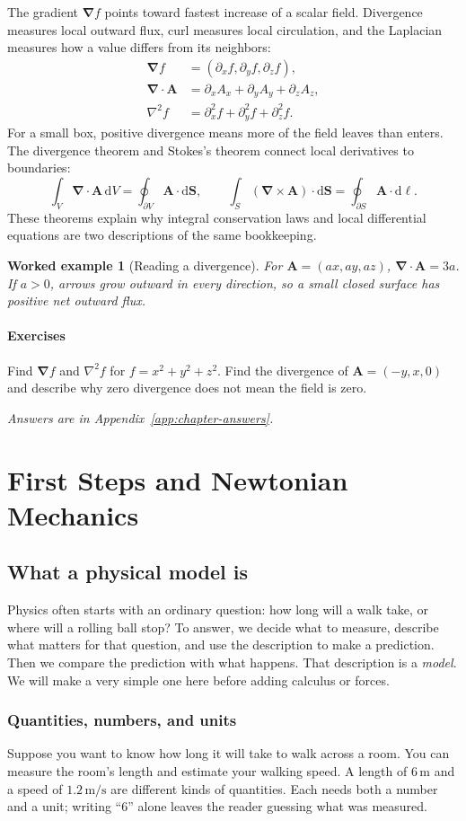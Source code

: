 \documentclass[11pt,oneside]{book}
\newcommand{\dd}{\mathrm{d}}
\newcommand{\vect}[1]{\boldsymbol{#1}}
\newcommand{\grad}{\boldsymbol{\nabla}}
\newcommand{\lap}{\nabla^2}
\theoremstyle{reviewstyle}
\newtheorem{example}{Worked example}[chapter]
\newcommand{\learningcheck}[1]{\subsection*{Exercises}\noindent #1\par\smallskip\noindent\emph{Answers are in Appendix~\ref{app:chapter-answers}.}}
\begin{document}
The gradient $\grad f$ points toward fastest increase of a scalar field. Divergence measures local outward flux, curl measures local circulation, and the Laplacian measures how a value differs from its neighbors:
\begin{align}
\grad f&=(\partial_xf,\partial_yf,\partial_zf),\\
\grad\cdot\vect A&=\partial_xA_x+\partial_yA_y+\partial_zA_z,\\
\lap f&=\partial_x^2f+\partial_y^2f+\partial_z^2f.
\end{align}
For a small box, positive divergence means more of the field leaves than enters. The divergence theorem and Stokes's theorem connect local derivatives to boundaries:
\begin{equation}
\int_V\grad\cdot\vect A\,\dd V=\oint_{\partial V}\vect A\cdot\dd\vect S,
\qquad
\int_S(\grad\times\vect A)\cdot\dd\vect S=\oint_{\partial S}\vect A\cdot\dd\vect\ell.
\end{equation}
These theorems explain why integral conservation laws and local differential equations are two descriptions of the same bookkeeping.

\begin{example}[Reading a divergence]
For $\vect A=(ax,ay,az)$, $\grad\cdot\vect A=3a$. If $a>0$, arrows grow outward in every direction, so a small closed surface has positive net outward flux.
\end{example}

\learningcheck{Find $\grad f$ and $\lap f$ for $f=x^2+y^2+z^2$. Find the divergence of $\vect A=(-y,x,0)$ and describe why zero divergence does not mean the field is zero.}

\part{First Steps and Newtonian Mechanics}
\chapter{What a physical model is}
Physics often starts with an ordinary question: how long will a walk take, or where will a rolling ball stop? To answer, we decide what to measure, describe what matters for that question, and use the description to make a prediction. Then we compare the prediction with what happens. That description is a \emph{model}. We will make a very simple one here before adding calculus or forces.

\section{Quantities, numbers, and units}
Suppose you want to know how long it will take to walk across a room. You can measure the room's length and estimate your walking speed. A length of $6\,\mathrm m$ and a speed of $1.2\,\mathrm{m/s}$ are different kinds of quantities. Each needs both a number and a unit; writing ``6'' alone leaves the reader guessing what was measured.
\end{document}
